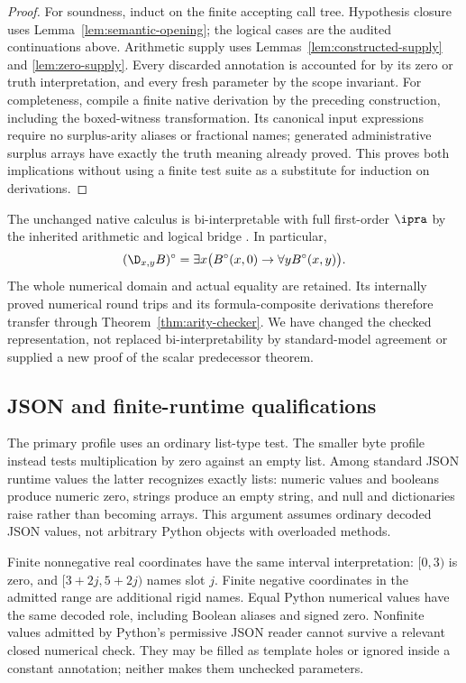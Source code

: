 \begin{proof}
For soundness, induct on the finite accepting call tree.  Hypothesis
closure uses Lemma~\ref{lem:semantic-opening}; the logical cases are
the audited continuations above.  Arithmetic supply uses
Lemmas~\ref{lem:constructed-supply} and \ref{lem:zero-supply}.
Every discarded annotation is accounted for by its zero or truth
interpretation, and every fresh parameter by the scope invariant.
For completeness, compile a finite native derivation by the preceding
construction, including the boxed-witness transformation.  Its
canonical input expressions require no surplus-arity aliases or fractional
names; generated administrative surplus arrays have exactly the truth
meaning already proved.  This proves both implications without using a finite test
suite as a substitute for induction on derivations.
\end{proof}

The unchanged native calculus is bi-interpretable with full first-order
$\ipra$ by the inherited arithmetic and logical bridge
\cite{generated,corpus}.  In particular,
\[
 (\D_{x,y}B)^\circ
 =\exists x\bigl(B^\circ(x,0)\to\forall yB^\circ(x,y)\bigr).
\]
The whole numerical domain and actual equality are retained.  Its
internally proved numerical round trips and its formula-composite
derivations therefore transfer through
Theorem~\ref{thm:arity-checker}.  We have changed the checked
representation, not replaced bi-interpretability by standard-model
agreement or supplied a new proof of the scalar predecessor theorem.

\subsection{JSON and finite-runtime qualifications}

The primary profile uses an ordinary list-type test.  The smaller byte
profile instead tests multiplication by zero against an empty list.
Among standard JSON runtime values the latter recognizes exactly lists:
numeric values and booleans produce numeric zero, strings produce an
empty string, and null and dictionaries raise rather than becoming
arrays.  This argument assumes ordinary decoded JSON values, not
arbitrary Python objects with overloaded methods.

Finite nonnegative real coordinates have the same interval
interpretation: $[0,3)$ is zero, and $[3+2j,5+2j)$ names slot $j$.
Finite negative coordinates in the admitted range are additional rigid
names.  Equal Python numerical values have the same decoded role,
including Boolean aliases and signed zero.  Nonfinite values admitted
by Python's permissive JSON reader cannot survive a relevant closed
numerical check.  They may be filled as template holes or ignored
inside a constant annotation; neither makes them unchecked parameters.

